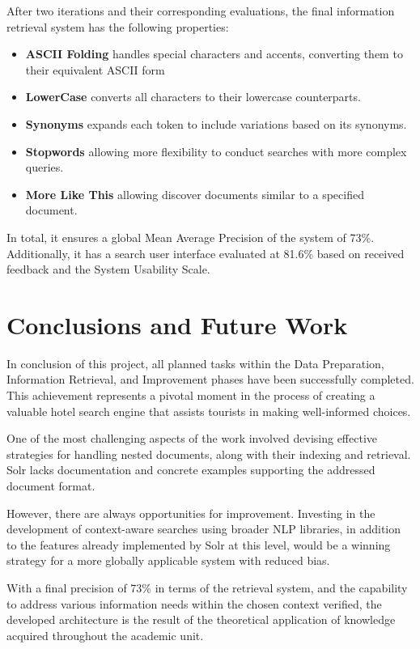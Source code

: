 \documentclass[sigconf]{acmart}
\begin{document}
After two iterations and their corresponding evaluations, the final information retrieval system has the following properties:

\begin{itemize}
    \item \textbf{ASCII Folding} handles special characters and accents, converting them to their equivalent ASCII form
    \item \textbf{LowerCase} converts all characters to their lowercase counterparts.
    \item \textbf{Synonyms} expands each token to include variations based on its synonyms.
    \item \textbf{Stopwords} allowing more flexibility to conduct searches with more complex queries.
    \item \textbf{More Like This} allowing discover documents similar to a specified document.
\end{itemize}



In total, it ensures a global Mean Average Precision of the system of 73\%. Additionally, it has a search user interface evaluated at 81.6\% based on received feedback and the System Usability Scale.

\section{Conclusions and Future Work}

In conclusion of this project, all planned tasks within the Data Preparation, Information Retrieval, and Improvement phases have been successfully completed. This achievement represents a pivotal moment in the process of creating a valuable hotel search engine that assists tourists in making well-informed choices.

One of the most challenging aspects of the work involved devising effective strategies for handling nested documents, along with their indexing and retrieval. Solr lacks documentation and concrete examples supporting the addressed document format.

However, there are always opportunities for improvement. Investing in the development of context-aware searches using broader NLP libraries, in addition to the features already implemented by Solr at this level, would be a winning strategy for a more globally applicable system with reduced bias.

With a final precision of 73\% in terms of the retrieval system, and the capability to address various information needs within the chosen context verified, the developed architecture is the result of the theoretical application of knowledge acquired throughout the academic unit.
\end{document}
